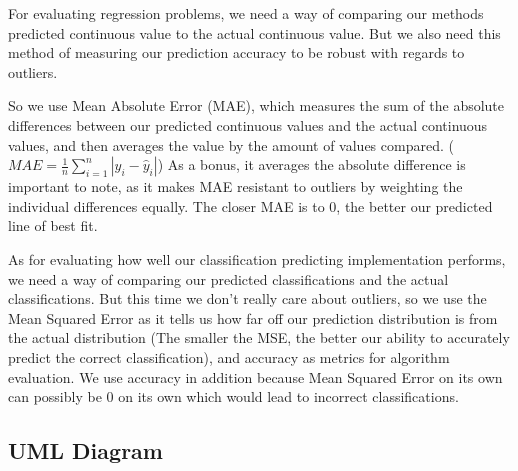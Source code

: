 \documentclass{article}
\begin{document}
For evaluating regression problems, we need a way of comparing our methods predicted continuous value to the actual continuous value. But we also need this method of measuring our prediction accuracy to be robust with regards to outliers.

So we use Mean Absolute Error (MAE), which measures the sum of the absolute differences between our predicted continuous values and the actual continuous values, and then averages the value by the amount of values compared. ($MAE = \frac{1}{n} \sum_{i=1}^n | y_i - \hat{y}_i|$) As a bonus, it averages the absolute difference is important to note, as it makes MAE resistant to outliers by weighting the individual differences equally. The closer MAE is to 0, the better our predicted line of best fit.

As for evaluating how well our classification predicting implementation performs, we need a way of comparing our predicted classifications and the actual classifications. But this time we don’t really care about outliers, so we use the Mean Squared Error as it tells us how far off our prediction distribution is from the actual distribution (The smaller the MSE, the better our ability to accurately predict the correct classification), and accuracy as metrics for algorithm evaluation. We use accuracy in addition because Mean Squared Error on its own can possibly be 0 on its own which would lead to incorrect classifications.



\subsection*{UML Diagram}
\begin{center}
\end{center}
\end{document}

